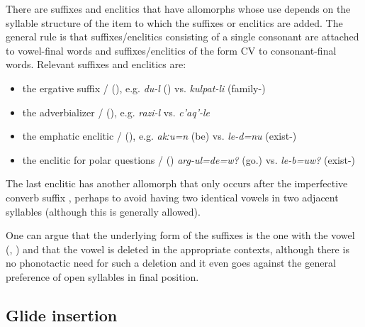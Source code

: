 There are suffixes and enclitics that have allomorphs whose use depends on the syllable structure of the item to which the suffixes or enclitics are added. The general rule is that suffixes\slash enclitics consisting of a single consonant are attached to vowel-final words and suffixes\slash enclitics of the form CV to consonant-final words. Relevant suffixes and enclitics are:
%
\begin{itemize}
	\item	the ergative suffix \slash{} (), e.g. \textit{du-l} () vs. \textit{kulpat-li} (family-)
	\item	the adverbializer \slash{} (), e.g. \textit{razi-l}  vs. \textit{c'aq'-le} 
	\item	the emphatic enclitic \slash{} (), e.g. \textit{akːu=n} (be) vs. \textit{le-d=nu} (exist-)
	\item	the enclitic for polar questions \slash{} () \textit{arg-ul=de=w?} (go.)  vs. \textit{le-b=uw?} (exist-) 
\end{itemize}

The last enclitic has another allomorph  that only occurs after the imperfective converb suffix , perhaps to avoid having two identical vowels in two adjacent syllables (although this is generally allowed).

One can argue that the underlying form of the suffixes is the one with the vowel (, ) and that the vowel is deleted in the appropriate contexts, although there is no phonotactic need for such a deletion and it even goes against the general preference of open syllables in final position.



\subsection{Glide insertion}
\label{ssec:Glide insertion}


